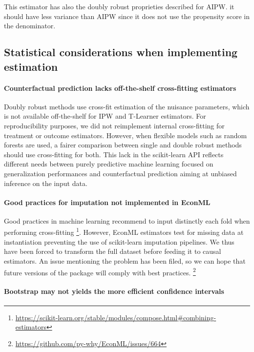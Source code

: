\documentclass[french,12pt,twoside,a4paper]{book}
\begin{document}
\begin{appendices}
  This estimator has also the doubly robust proprieties described for AIPW. it
  should have less variance than AIPW since it does not use the propensity score
  in the denominator.


  \subsection{Statistical considerations when implementing
    estimation}\label{apd:statistical_considerations}

  \paragraph{Counterfactual prediction lacks off-the-shelf cross-fitting estimators}

  Doubly robust methods use cross-fit estimation of the nuisance parameters, which
  is not available off-the-shelf for IPW and T-Learner estimators. For
  reproducibility purposes, we did not reimplement internal cross-fitting for
  treatment or outcome estimators. However, when flexible models such as random
  forests are used, a fairer comparison between single and double robust methods
  should use cross-fitting for both. This lack in the scikit-learn API reflects
  different needs between purely predictive machine learning focused on
  generalization performances and counterfactual prediction aiming at unbiased
  inference on the input data.

  \paragraph{Good practices for imputation not implemented in EconML}

  Good practices in machine learning recommend to input distinctly each fold
  when performing cross-fitting
  \footnote{\url{https://scikit-learn.org/stable/modules/compose.html\#combining-estimators}}.
  However, EconML estimators test for missing data at instantiation
  preventing the use of scikit-learn imputation pipelines. We thus have been
  forced to transform the full dataset before feeding it to causal estimators.
  An issue mentioning the problem has been filed, so we can hope that future
  versions of the package will comply with best practices. \footnote{\url{https://github.com/py-why/EconML/issues/664}}

  \paragraph{Bootstrap may not yields the more efficient confidence intervals}


\end{appendices}
\end{document}
